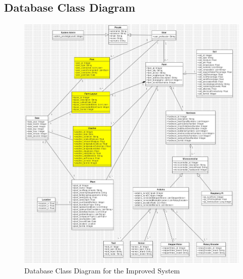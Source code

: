 \newpage
\subsection{Database Class Diagram}
\begin{figure}[htbp]
    \centering
    \includegraphics[width=0.9\linewidth]{Figures/improved_database_class_diagram.jpg}
    \caption{Database Class Diagram for the Improved System}
    \label{DatabaseImproved}
\end{figure}
\newpage

